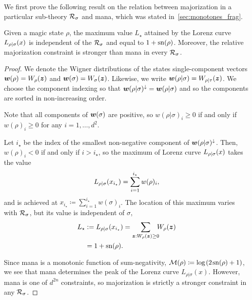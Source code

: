 \documentclass[pra,
aps,
twocolumn,
superscriptaddress,
groupedaddress,
nofootinbib,
reprint
]{revtex4-1}
\begin{document}
We first prove the following result on the relation between majorization in a particular sub-theory ${\mathcal R}_\sigma$ and mana, which was stated in~\cref{sec:monotones_frag}.
\begingroup
\def\thetheorem{\ref{lem:lcmax}}
\begin{theorem}
	Given a magic state $\rho$, the maximum value $L_\star$ attained by the Lorenz curve ${L_{\rho|\sigma}}(x)$ is independent of the ${\mathcal R}_\sigma$ and equal to $1+{{\rm{sn}}(\rho)}$. Moreover, the relative majorization constraint is stronger than mana in every ${\mathcal R}_\sigma$.
\end{theorem}
\addtocounter{theorem}{-1}
\endgroup
\begin{proof}
	We denote the Wigner distributions of the states single-component vectors $\boldsymbol{w}(\rho)=W_\rho(\boldsymbol{z})$ and $ \boldsymbol{w}(\sigma)=W_\sigma(\boldsymbol{z})$. Likewise, we write $\boldsymbol{w}(\rho|\sigma) = W_{\rho|\tau}(\bm{z})$.
	We choose the component indexing so that $\boldsymbol{w}(\rho|\sigma)^\downarrow = \boldsymbol{w}(\rho|\sigma)$ and so the components are sorted in non-increasing order.

Note that all components of $\bm{w}(\sigma)$ are positive, so $w(\rho|\sigma)_i \geq 0$ if and only if $w(\rho)_i \geq 0$ for any $i=1,\dots,d^2$.
	
	Let $i_\star$ be the index of the smallest non-negative component of $\boldsymbol{w}(\rho|\sigma)^\downarrow$.
	Then, $w(\rho)_i < 0$ if and only if $i > i_\star$, so the maximum of Lorenz curve ${L_{\rho|\sigma}}(x)$ takes the value 
	\begin{equation}
		{L_{\rho|\sigma}}(x_{i_\star}) = \sum_{i=1}^{i_\star} w(\rho)_i,
	\end{equation}
	and is achieved at $x_{i_\star} \coloneqq \sum_{i=1}^{i_\star} w(\sigma)_i$. The location of this maximum varies with ${\mathcal R}_\sigma$, but its value is independent of $\sigma$,
	\begin{align}
	L_\star &:=	\lc{\rho}{\sigma}(x_{i_\star}) 
		= \sum\limits_{\bmz: \W[\bmz]{\rho} \geq 0}\hspace{-5pt} \W[\bmz]{\rho} \nonumber \\
		&= 1 + \sn{\rho}.
	\end{align}
	
Since mana is a monotonic function of sum-negativity, ${\mathcal M}(\rho) \coloneqq \log \hspace{1pt}(2\hspace{1pt}{{\rm{sn}}(\rho)}+1)$, we see that mana determines the peak of the Lorenz curve $L_{\rho|\sigma}(x)$. However, mana is one of $d^{2n}$ constraints, so majorization is strictly a stronger constraint in any ${\mathcal R}_\sigma$.
\end{proof}
\end{document}
